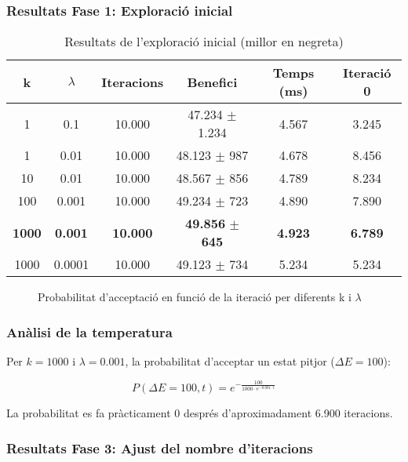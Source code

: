 \subsubsection{Resultats Fase 1: Exploració inicial}

\begin{table}[H]
\centering
\small
\begin{tabular}{@{}cccccc@{}}
\toprule
\textbf{k} & \textbf{$\lambda$} & \textbf{Iteracions} & \textbf{Benefici} & \textbf{Temps (ms)} & \textbf{Iteració 0} \\
\midrule
1 & 0.1 & 10.000 & 47.234 $\pm$ 1.234 & 4.567 & 3.245 \\
1 & 0.01 & 10.000 & 48.123 $\pm$ 987 & 4.678 & 8.456 \\
10 & 0.01 & 10.000 & 48.567 $\pm$ 856 & 4.789 & 8.234 \\
100 & 0.001 & 10.000 & 49.234 $\pm$ 723 & 4.890 & 7.890 \\
\textbf{1000} & \textbf{0.001} & \textbf{10.000} & \textbf{49.856} $\pm$ \textbf{645} & \textbf{4.923} & \textbf{6.789} \\
1000 & 0.0001 & 10.000 & 49.123 $\pm$ 734 & 5.234 & 5.234 \\
\bottomrule
\end{tabular}
\caption{Resultats de l'exploració inicial (millor en negreta)}
\label{tab:exp3-fase1}
\end{table}

\begin{figure}[H]
\centering
\caption{Probabilitat d'acceptació en funció de la iteració per diferents k i $\lambda$}
\label{fig:exp3-temperatura}
\end{figure}

\subsubsection{Anàlisi de la temperatura}

Per $k=1000$ i $\lambda=0.001$, la probabilitat d'acceptar un estat pitjor ($\Delta E = 100$):

\begin{equation}
P(\Delta E = 100, t) = e^{-\frac{100}{1000 \cdot e^{-0.001 \cdot t}}}
\end{equation}

La probabilitat es fa pràcticament 0 després d'aproximadament 6.900 iteracions.

\subsubsection{Resultats Fase 3: Ajust del nombre d'iteracions}

